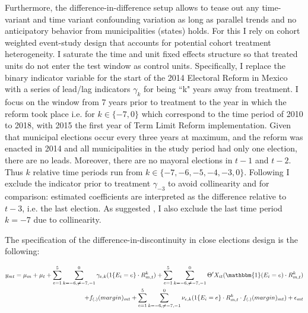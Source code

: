 \documentclass[12pt]{amsart}
\numberwithin{equation}{section}
\theoremstyle{definition}
\theoremstyle{definition}
\theoremstyle{definition}
\begin{document}
Furthermore, the difference-in-difference setup allows to tease out any time-variant and time variant confounding variation as long as parallel trends and no anticipatory behavior from municipalities (states) holds. For this I rely on \citet{abraham_sun_2020} cohort weighted event-study design that accounts for potential cohort treatment heterogeneity. I saturate the time and unit fixed effects structure so that treated units do not enter the test window as control units. Specifically, I replace the binary indicator variable for the start of the 2014 Electoral Reform in Mexico with a series of lead/lag indicators $\gamma_k$ for being ``k" years away from treatment. I focus on the window from 7 years prior to treatment to the year in which the reform took place i.e. for $k \in \{-7,0\} $ which correspond to the time period of 2010 to 2018, with 2015 the first year of Term Limit Reform implementation. Given that municipal elections occur every three years at maximum, and the reform was enacted in 2014 and all municipalities in the study period had only one election, there are no leads. Moreover, there are no mayoral elections in $t-1$ and $t-2$. Thus $k$ relative time periods run from  $k \in\{-7,-6,-5,-4,-3,0\}$. Following \citet{abraham_sun_2020} I exclude the indicator prior to treatment  $\gamma_{-3}$ to avoid collinearity and for comparison: estimated coefficients are interpreted as the difference relative to $t-3$, i.e. the last election. As suggested   \citet{abraham_sun_2020}, I also exclude the last time period $k=-7$ due to collinearity.

The specification of the difference-in-discontinuity in close elections design is the following:

\begin{equation}
\begin{split}
\label{eq:abraham}
y_{mt}=\mu_m + \mu_t + \sum^5_{e=1} \sum^0_{k=-6, \neq {-7,-1}} \gamma_{e,k}(1\{E_i=e\} \cdot R^k_{m,t}) + \sum^5_{e=1} \sum^0_{k=-6, \neq {-7,-1}}  \Theta'X_{it} (\mathbbm{1}(E_i=e)\cdot R^k_{m,t})  \\
+ f_{(.)}(margin)_{mt} + \sum^5_{e=1} \sum^0_{k=-6, \neq {-7,-1}} \nu_{e,k}(1\{E_i=e\} \cdot R^k_{m,t} \cdot  f_{(.)}(margin)_{mt} )+ \epsilon_{mt}
\end{split}
\end{equation}   
\end{document}
